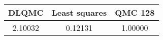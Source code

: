 \begin{tabular}{|c|c|c|}
\hline
DLQMC&Least squares&QMC 128\\ 
\hline

2.10032 & 0.12131 & 1.00000\\ 
\hline
\end{tabular}

